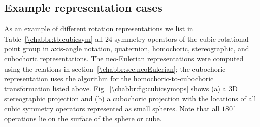 \subsection{Example representation cases}
As an example of different rotation representations we list in Table~\ref{\chabbr:tb:cubicsym} all $24$ symmetry operators of the cubic rotational point group  in axis-angle notation, quaternion, homochoric, stereographic, and cubochoric representations.  The neo-Eulerian representations were computed using the relations in section~\ref{\chabbr:sec:neoEulerian}; the cubochoric representation uses the algorithm for the homochoric-to-cubochoric transformation listed above.  Fig.~\ref{\chabbr:fig:cubicsymops} shows (a) a 3D stereographic projection and (b) a cubochoric projection with the locations of all cubic symmetry operators represented as small spheres.   Note that all $180^{\circ}$ operations lie on the surface of the sphere or cube.


